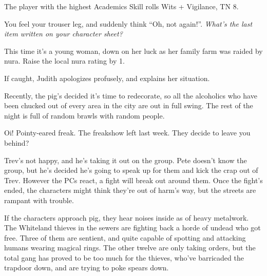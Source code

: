 \begin{multicols}{2}

The player with the highest Academics Skill rolls Wits + Vigilance, TN 8.

\begin{boxtext}

	You feel your trouser leg, and suddenly think ``Oh, not again!''.  \textit{What's the last item written on your character sheet?}

\end{boxtext}

This time it's a young woman, down on her luck as her family farm was raided by nura.  Raise the local nura rating by 1.

If caught, Judith apologizes profusely, and explains her situation.


\humanthief


Recently, the \gls{pig}'s decided it's time to redecorate, so all the alcoholics who have been chucked out of every area in the city are out in full swing.
The rest of the night is full of random brawls with random people.

\begin{boxtext}

	Oi! Pointy-eared freak.  The freakshow left last week.  They decide to leave you behind?

\end{boxtext}

Trev's not happy, and he's taking it out on the group.
Pete doesn't know the group, but he's decided he's going to speak up for them and kick the crap out of Trev.
However the PCs react, a fight will break out around them.
Once the fight's ended, the characters might think they're out of harm's way, but the streets are rampant with trouble.


\humanfarmer

If the characters approach \gls{pig}, they hear noises inside as of heavy metalwork.  The Whiteland thieves in the sewers are fighting back a horde of undead who got free.  Three of them are sentient, and quite capable of spotting and attacking humans wearing magical rings.  The other twelve are only taking orders, but the total gang has proved to be too much for the thieves, who've barricaded the trapdoor down, and are trying to poke spears down.


\end{multicols}
